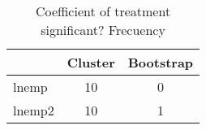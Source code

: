 \begin{table}[htbp]\centering
\caption{Coefficient of treatment significant? Frecuency}
\begin{tabular}{l*{2}{c}}
\toprule
            &     Cluster&   Bootstrap\\
\midrule
lnemp       &          10&           0\\
lnemp2      &          10&           1\\
\bottomrule
\end{tabular}
\end{table}
